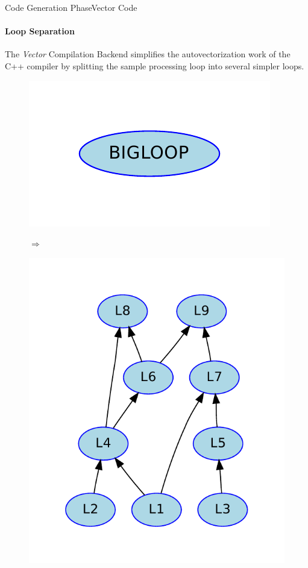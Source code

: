  
\begin{frame}{Code Generation Phase}{Vector Code}
\framesubtitle{Loop Separation}
The \textit{Vector} Compilation Backend simplifies the autovectorization work of the C++ compiler by splitting the sample processing loop into several simpler loops. 

   \begin{figure}[h]
     \centering
 	\parbox{.4\linewidth}{
 		\includegraphics[scale=0.8]{images/singleloop}
 	}
   $\Rightarrow$ 
 	\parbox{.4\linewidth}{
 		\includegraphics[scale=0.5]{images/loopgraph2}
 	}
   \end{figure}  
\end{frame}
 
